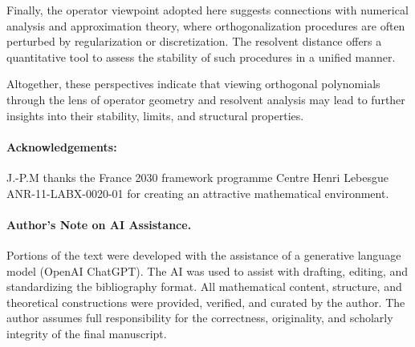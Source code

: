 \documentclass{amsart}
\numberwithin{equation}{section}
\theoremstyle{definition}
\theoremstyle{remark}
\begin{document}
Finally, the operator viewpoint adopted here suggests connections with numerical analysis
and approximation theory, where orthogonalization procedures are often perturbed by
regularization or discretization.
The resolvent distance offers a quantitative tool to assess the stability of such procedures
in a unified manner.

Altogether, these perspectives indicate that viewing orthogonal polynomials through the
lens of operator geometry and resolvent analysis may lead to further insights into their
stability, limits, and structural properties.

\vskip 12pt

\paragraph{\bf Acknowledgements:} J.-P.M thanks the France 2030 framework programme Centre Henri Lebesgue ANR-11-LABX-0020-01 
for creating an attractive mathematical environment.

\vskip 12pt

\paragraph{\bf Author's Note on AI Assistance.}
Portions of the text were developed with the assistance of a generative language model (OpenAI ChatGPT). The AI was used to assist with drafting, editing, and standardizing the bibliography format. All mathematical content, structure, and theoretical constructions were provided, verified, and curated by the author. The author assumes full responsibility for the correctness, originality, and scholarly integrity of the final manuscript.
\end{document}
